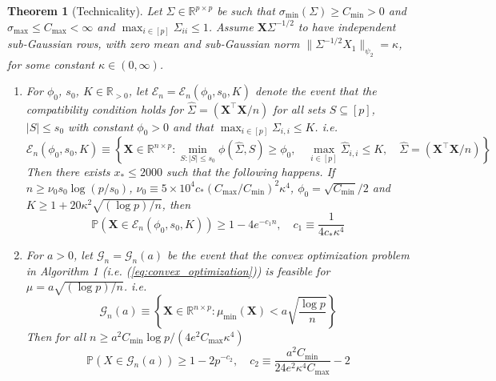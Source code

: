 \documentclass[10pt,a4paper]{amsart}
\newtheorem{theorem}{Theorem}
\begin{document}
\begin{theorem}[Technicality]
\label{thm:thm7}
   Let $\Sigma \in \mathbb{R}^{p\times p}$ be such that $\sigma_{\text{min}}(\Sigma) \ge C_{\text{min}} >0$ and $\sigma_{\text{max}}\le C_{\text{max}}<\infty$ and $\max_{i \in [p]} \Sigma_{ii}\le1$. Assume $\mathbf{X}\Sigma^{-1/2}$ to have independent sub-Gaussian rows, with zero mean and sub-Gaussian norm $\|\Sigma^{-1/2} X_1\|_{\psi_2} = \kappa$, for some constant $\kappa \in (0, \infty)$.
   \begin{enumerate}[label=(\alph*)]
       \item For  $\phi_0$, $s_0$, $K\in \mathbb{R}_{>0}$, let $\mathcal{E}_n = \mathcal{E}_n(\phi_0, s_0, K)$ denote the event that the compatibility condition holds for $\hat{\Sigma} = (\mathbf{X}^\top\mathbf{X}/n)$ for all sets $S \subseteq[p]$, $|S| \le s_0$ with constant $\phi_0>0$ and that $\max_{i\in [p]}\Sigma_{i,i} \le K$. i.e.
       \begin{equation}
           \mathcal{E}_n(\phi_0, s_0, K) \equiv \left\{\mathbf{X}\in \mathbb{R}^{n\times p}: \min_{S: |S| \le s_0} \phi(\hat{\Sigma}, S) \ge \phi_0, \quad \max_{i\in [p]}\hat{\Sigma}_{i,i} \le K,\quad \hat{\Sigma}= (\mathbf{X}^{\top}\mathbf{X}/n)\right\}
       \end{equation}
       Then there exists $x_* \le 2000$ such that the following happens. If $n \ge \nu_0 s_0 \log(p/s_0)$, $\nu_0 \equiv 5 \times 10^4 c_*(C_{\text{max}}/C_{\text{min}})^2 \kappa^4$, $\phi_0 = \sqrt{C_{\text{min}}}/2$ and $K \ge 1 + 20 \kappa^2 \sqrt{(\log p)/n}$, then
       \begin{equation}
           \mathbb{P}(\mathbf{X} \in \mathcal{E}_n(\phi_0, s_0, K)) \ge 1 - 4e^{-c_1n}, \quad c_1 \equiv \frac{1}{4c_* \kappa^4}
       \end{equation}
       \item For $a >0$, let $\mathcal{G}_n= \mathcal{G}_n(a)$ be the event that the convex optimization problem in Algorithm 1 (i.e. (\ref{eq:convex_optimization})) is feasible for $\mu = a \sqrt{(\log p)/n}$. i.e.
       \begin{equation}
           \mathcal{G}_n(a) \equiv \left\{\mathbf{X}\in \mathbb{R}^{n\times p}: \mu_{\text{min}}(\mathbf{X}) < a \sqrt{\frac{\log p}n} \right\}
       \end{equation}
       Then for all $n \ge a^2 C_{\text{min}}\log p /(4e^2C_{\max}\kappa^4)$
       \begin{equation}
               \mathbb{P}(X\in \mathcal{G}_n(a)) \ge 1 - 2p^{-c_2}, \quad c_2 \equiv \frac{a^2 C_{\min}}{24 e^2 \kappa^4 C_{\max}}-2
       \end{equation}
   \end{enumerate}
\end{theorem}
\end{document}
